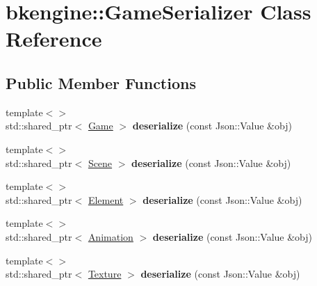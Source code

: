 \hypertarget{classbkengine_1_1GameSerializer}{}\section{bkengine\+:\+:Game\+Serializer Class Reference}
\label{classbkengine_1_1GameSerializer}
\subsection*{Public Member Functions}
\begin{DoxyCompactItemize}
\item 
\mbox{\label{classbkengine_1_1GameSerializer_af853c4ab4056f5d5ccf56d6afadf976c}} 
{\footnotesize template$<$$>$ }\\std\+::shared\+\_\+ptr$<$ \hyperlink{classbkengine_1_1Game}{Game} $>$ {\bfseries deserialize} (const Json\+::\+Value \&obj)
\item 
\mbox{\label{classbkengine_1_1GameSerializer_a4ca10de97f0c3ca5e69ec3ebc82c98ea}} 
{\footnotesize template$<$$>$ }\\std\+::shared\+\_\+ptr$<$ \hyperlink{classbkengine_1_1Scene}{Scene} $>$ {\bfseries deserialize} (const Json\+::\+Value \&obj)
\item 
\mbox{\label{classbkengine_1_1GameSerializer_a47ee0a5fab46238fee119f05226bc02b}} 
{\footnotesize template$<$$>$ }\\std\+::shared\+\_\+ptr$<$ \hyperlink{classbkengine_1_1Element}{Element} $>$ {\bfseries deserialize} (const Json\+::\+Value \&obj)
\item 
\mbox{\label{classbkengine_1_1GameSerializer_a88615bdca14bcb3309e435c677555529}} 
{\footnotesize template$<$$>$ }\\std\+::shared\+\_\+ptr$<$ \hyperlink{classbkengine_1_1Animation}{Animation} $>$ {\bfseries deserialize} (const Json\+::\+Value \&obj)
\item 
\mbox{\label{classbkengine_1_1GameSerializer_a77c6a2676347b3c51d0596e3b89c09db}} 
{\footnotesize template$<$$>$ }\\std\+::shared\+\_\+ptr$<$ \hyperlink{classbkengine_1_1Texture}{Texture} $>$ {\bfseries deserialize} (const Json\+::\+Value \&obj)
\end{DoxyCompactItemize}

